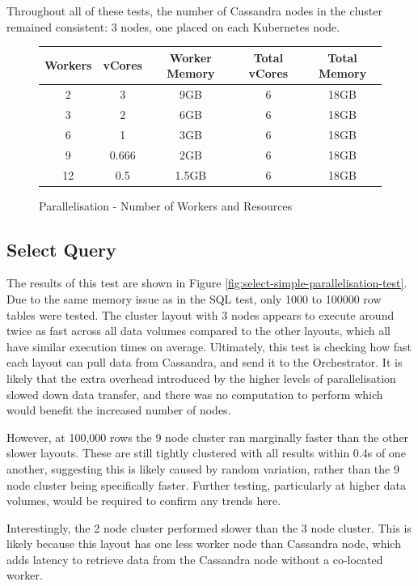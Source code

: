 Throughout all of these tests, the number of Cassandra nodes in the cluster remained consistent: 3 nodes, one placed on each Kubernetes node.

\begin{figure}[ht]
	\centering
	\begin{tabular}{| c | c | c | c | c |}
		\hline
		\textbf{Workers} & \textbf{vCores} & \textbf{Worker Memory} & \textbf{Total vCores} & \textbf{Total Memory} \\ \hline
		2 & 3 & 9GB & 6 & 18GB \\ \hline
		3 & 2 & 6GB & 6 & 18GB \\ \hline
		6 & 1 & 3GB & 6 & 18GB \\ \hline
		9 & 0.666 & 2GB & 6 & 18GB \\ \hline
		12 & 0.5 & 1.5GB & 6 & 18GB \\ \hline
	\end{tabular}
	\caption{Parallelisation - Number of Workers and Resources}
	\label{fig:parallelisation-test-workers}
\end{figure}

\subsection{Select Query}
The results of this test are shown in Figure \ref{fig:select-simple-parallelisation-test}. Due to the same memory issue as in the SQL test, only 1000 to 100000 row tables were tested. The cluster layout with 3 nodes appears to execute around twice as fast across all data volumes compared to the other layouts, which all have similar execution times on average. Ultimately, this test is checking how fast each layout can pull data from Cassandra, and send it to the Orchestrator. It is likely that the extra overhead introduced by the higher levels of parallelisation slowed down data transfer, and there was no computation to perform which would benefit the increased number of nodes. 

However, at 100,000 rows the 9 node cluster ran marginally faster than the other slower layouts. These are still tightly clustered with all results within 0.4s of one another, suggesting this is likely caused by random variation, rather than the 9 node cluster being specifically faster. Further testing, particularly at higher data volumes, would be required to confirm any trends here. 

Interestingly, the 2 node cluster performed slower than the 3 node cluster. This is likely because this layout has one less worker node than Cassandra node, which adds latency to retrieve data from the Cassandra node without a co-located worker. 


